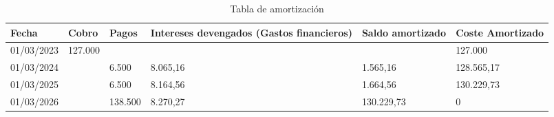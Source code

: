 \begin{table}[h]
    \centering
    \begin{tabular}{|p{2cm}|p{2cm}|p{2cm}|p{2cm}|p{2cm}|p{2cm}|}
        \hline
        \textbf{Fecha} & \textbf{Cobro} & \textbf{Pagos} & \textbf{Intereses devengados (Gastos financieros)} & \textbf{Saldo amortizado} & \textbf{Coste Amortizado} \\
        \hline
        01/03/2023 & 127.000 &  &  &  & 127.000 \\
        \hline
        01/03/2024 &  & 6.500 & 8.065,16 & 1.565,16 & 128.565,17 \\
        \hline
        01/03/2025 &  & 6.500 & 8.164,56 & 1.664,56 & 130.229,73 \\
        \hline
        01/03/2026 &  & 138.500 & 8.270,27 & 130.229,73 & 0 \\
        \hline
    \end{tabular}
    \caption{Tabla de amortización}
    \label{tab:amortizacion}
\end{table}


